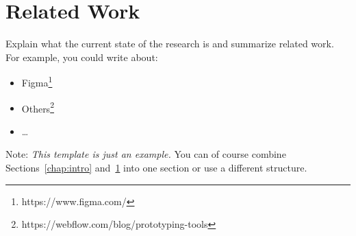 \chapter{Related Work} \label{chap:csr}

Explain what the current state of the research is and summarize related work. 
For example, you could write about: 
\begin{itemize}
	\item Figma\footnote{https://www.figma.com/}
	\item Others\footnote{https://webflow.com/blog/prototyping-tools} 	
	\item \dots
\end{itemize}

Note: \emph{This template is just an example.} You can of course combine Sections~\ref{chap:intro} and~\ref{chap:csr} into one section or use a different structure.
